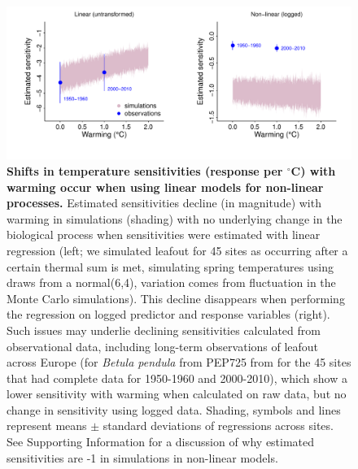 \documentclass[11pt,letter]{article}
\begin{document}
\begin{figure}[h!]
\centering
\noindent \includegraphics[width=1.05\textwidth]{..//analyses/figures/basicsimsandpepalt1.pdf} %
\caption{\textbf{Shifts in temperature sensitivities (response per $^{\circ}$C)  with warming occur when using linear models for non-linear processes.} Estimated sensitivities decline (in magnitude) with warming in simulations (shading) with no underlying change in the biological process when sensitivities were estimated with linear regression (left; we simulated leafout for 45 sites as occurring after a certain thermal sum is met, simulating spring temperatures using draws from a normal(6,4), variation comes from fluctuation in the Monte Carlo simulations). This decline disappears when performing the regression on logged predictor and response variables (right). Such issues may underlie declining sensitivities calculated from observational data, including long-term observations of leafout across Europe (for \emph{Betula pendula} from PEP725 from for the 45 sites that had complete data for 1950-1960 and 2000-2010), which show a lower sensitivity with warming when calculated on raw data, but no change in sensitivity using logged data. Shading, symbols and lines represent means $\pm$ standard deviations of regressions across sites. See Supporting Information for a discussion of why estimated sensitivities are -1 in simulations in non-linear models.} %
\label{fig:basicsimswpep} %
\end{figure}
\end{document}
